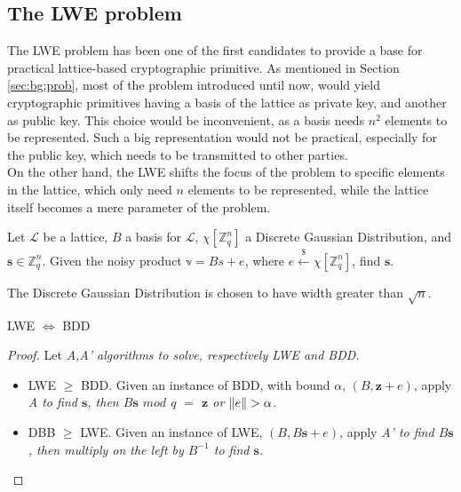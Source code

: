 \subsection{The LWE problem}
The LWE problem has been one of the first candidates to provide a base for practical lattice-based cryptographic primitive. As mentioned in Section \ref{sec:bg:prob}, most of the problem introduced until now, would yield cryptographic primitives having a basis of the lattice as private key, and another as public key. This choice would be inconvenient, as a basis needs $n^2$ elements to be represented. Such a big representation would not be practical, especially for the public key, which needs to be transmitted to other parties.\\
On the other hand, the LWE shifts the focus of the problem to specific elements in the lattice, which only need $n$ elements to be represented, while the lattice itself becomes a mere parameter of the problem.\\


\begin{definition}
Let $\mathscr{L}$ be a lattice, $B$ a basis for $\mathscr{L}$, $\chi[\mathbb{Z}_q^n]$ a Discrete Gaussian Distribution, and $\mathbf{s}\in\mathbb{Z}_q^n$. Given the noisy product $\mathbb{v}=Bs + e$, where $e\xleftarrow{\$}\chi[\mathbb{Z}_q^n]$, find $\mathbf{s}$.
\end{definition}

\begin{remark}
The Discrete Gaussian Distribution is chosen to have width greater than $\sqrt{n}$.
\end{remark}

\begin{theorem}
LWE $\Leftrightarrow$ BDD
\end{theorem}
\begin{proof}
Let \it{A},\it{A'} algorithms to solve, respectively LWE and BDD.
\begin{itemize}
\item LWE $\geq$ BDD. Given an instance of BDD, with bound $\alpha$, $(B,\mathbf{z}+e)$, apply \it{A} to find $\mathbf{s}$, then $B\mathbf{s}$ $mod$ $q$ $=$ $\mathbf{z}$ or $\left\lVert e \right\rVert>\alpha$.
\item DBB $\geq$ LWE. Given an instance of LWE, $(B,B\mathbf{s}+e)$, apply \it{A'} to find $B\mathbf{s}$, then multiply on the left by $B^{-1}$ to find $\mathbf{s}$.
\end{itemize}
\end{proof}

